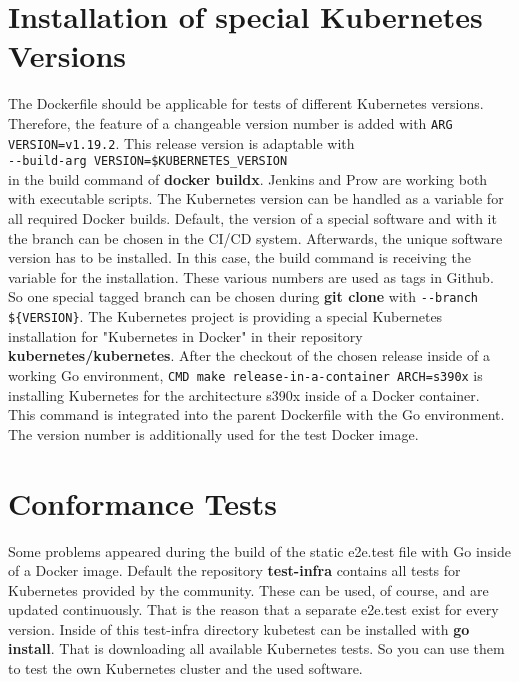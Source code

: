 \section{Installation of special Kubernetes Versions}

The Dockerfile should be applicable for tests of different Kubernetes versions. Therefore, the feature of a changeable version number is added with \lstinline!ARG VERSION=v1.19.2!. This release version is adaptable with \\
\verb+--build-arg VERSION=$KUBERNETES_VERSION+ \\
in the build command of \textbf{docker buildx}.
Jenkins and Prow are working both with executable scripts. The Kubernetes version can be handled as a variable for all required Docker builds.
Default, the version of a special software and with it the branch can be chosen in the \gls{CI/CD} system. Afterwards, the unique software version has to be installed. In this case, the build command is receiving the variable for the installation. These various numbers are used as tags in Github. So one special tagged branch can be chosen during \textbf{git clone} with \verb+--branch ${VERSION}+.
The Kubernetes project is providing a special Kubernetes installation for "Kubernetes in Docker" in their repository \textbf{kubernetes/kubernetes}.
After the checkout of the chosen release inside of a working Go environment, \verb+CMD make release-in-a-container ARCH=s390x+ is installing Kubernetes for the architecture s390x inside of a Docker container. \\
This command is integrated into the parent Dockerfile with the Go environment. The version number is additionally used for the test Docker image.


\section{Conformance Tests}

Some problems appeared during the build of the static e2e.test file with Go inside of a Docker image. 
Default the repository \textbf{test-infra} contains all tests for Kubernetes provided by the community. 
These can be used, of course, and are updated continuously. That is the reason that a separate e2e.test exist for every version. Inside of this test-infra directory kubetest can be installed with \textbf{go install}. 
That is downloading all available Kubernetes tests. So you can use them to test the own Kubernetes cluster and the used software. \\

